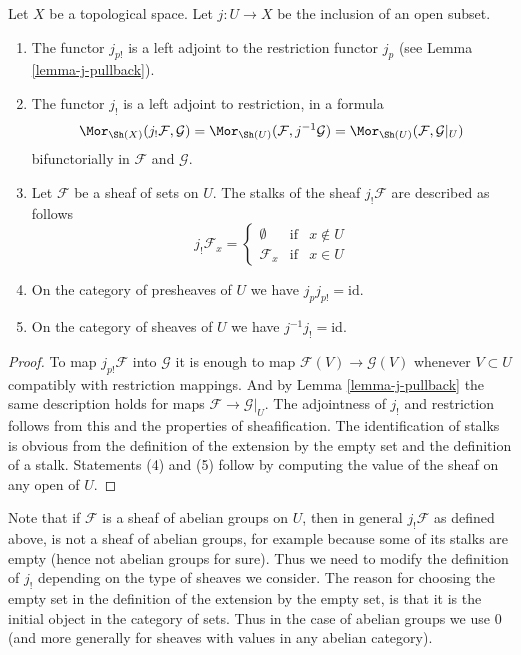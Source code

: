 \begin{lemma}
\label{lemma-j-shriek}
Let $X$ be a topological space.
Let $j : U \to X$ be the inclusion of an open subset.
\begin{enumerate}
\item The functor $j_{p!}$ is a left adjoint to the
restriction functor $j_p$ (see Lemma \ref{lemma-j-pullback}).
\item The functor $j_!$ is a left adjoint to restriction,
in a formula
$$
\Mor_{\Sh(X)}(j_!\mathcal{F}, \mathcal{G})
=
\Mor_{\Sh(U)}(\mathcal{F}, j^{-1}\mathcal{G})
=
\Mor_{\Sh(U)}(\mathcal{F}, \mathcal{G}|_U)
$$
bifunctorially in $\mathcal{F}$ and $\mathcal{G}$.
\item Let $\mathcal{F}$ be a sheaf of sets on $U$.
The stalks of the sheaf $j_!\mathcal{F}$ are described
as follows
$$
j_{!}\mathcal{F}_x =
\left\{
\begin{matrix}
\emptyset & \text{if} & x \not \in U \\
\mathcal{F}_x & \text{if} & x \in U
\end{matrix}
\right.
$$
\item On the category of presheaves of $U$ we have $j_pj_{p!} = \text{id}$.
\item On the category of sheaves of $U$ we have $j^{-1}j_! = \text{id}$.
\end{enumerate}
\end{lemma}

\begin{proof}
To map $j_{p!}\mathcal{F}$ into $\mathcal{G}$
it is enough to map $\mathcal{F}(V) \to \mathcal{G}(V)$
whenever $V \subset U$ compatibly with restriction
mappings. And by Lemma \ref{lemma-j-pullback}
the same description holds for maps
$\mathcal{F} \to \mathcal{G}|_U$.
The adjointness of $j_!$ and restriction follows
from this and the properties of sheafification.
The identification of stalks is obvious from the
definition of the extension by the empty set
and the definition of a stalk.
Statements (4) and (5) follow by computing the
value of the sheaf on any open of $U$.
\end{proof}

\noindent
Note that if $\mathcal{F}$ is a sheaf
of abelian groups on $U$, then in general $j_!\mathcal{F}$ as
defined above, is not a sheaf of abelian groups, for example
because some of its stalks are empty (hence not abelian groups
for sure). Thus we need to modify the definition of
$j_!$ depending on the type of sheaves we consider.
The reason for choosing the empty set in the definition of the
extension by the empty set, is that it is the initial object
in the category of sets. Thus in the case of abelian groups
we use $0$ (and more generally for sheaves with values in
any abelian category).

